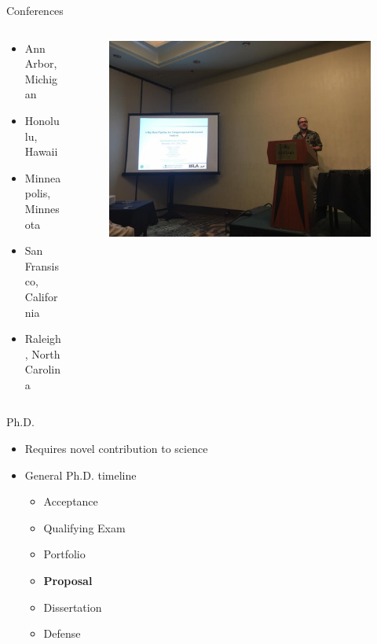 \documentclass{beamer}
\begin{document}
\begin{frame}{Conferences}
\begin{columns}
	\begin{column}{.50\textwidth}
		\begin{itemize}
			\item Ann Arbor, Michigan
			\item Honolulu, Hawaii
			\item Minneapolis, Minnesota
			\item San Fransisco, California
			\item Raleigh, North Carolina 
		\end{itemize}
	\end{column}
	\begin{column}{.50\textwidth}
		\begin{figure}
			\includegraphics[width=\linewidth]{img/conference.jpg}
		\end{figure}
	\end{column}
\end{columns}
\end{frame}

\begin{frame}{Ph.D.}
\begin{itemize}
	\item Requires novel contribution to science
	\item General Ph.D. timeline
	\begin{itemize}
		\item Acceptance
		\item Qualifying Exam
		\item Portfolio
		\item \textbf{Proposal}
		\item Dissertation
		\item Defense
	\end{itemize}
\end{itemize}
\end{frame}
\end{document}
